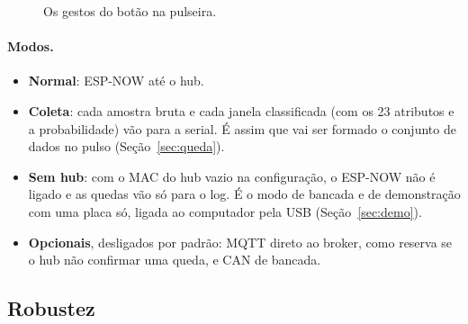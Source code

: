 \begin{figure}[H]
\centering
\resizebox{0.92\linewidth}{!}{}
\caption{Os gestos do botão na pulseira.}
\label{fig:botao_gestos}
\end{figure}

\paragraph{Modos.}
\begin{itemize}
  \item \textbf{Normal}: ESP-NOW até o hub.
  \item \textbf{Coleta}: cada amostra bruta e cada janela classificada (com os 23 atributos e
        a probabilidade) vão para a serial. É assim que vai ser formado o conjunto de dados
        no pulso (Seção~\ref{sec:queda}).
  \item \textbf{Sem hub}: com o MAC do hub vazio na configuração, o ESP-NOW não é ligado e as
        quedas vão só para o log. É o modo de bancada e de demonstração com uma placa só,
        ligada ao computador pela USB (Seção~\ref{sec:demo}).
  \item \textbf{Opcionais}, desligados por padrão: MQTT direto ao broker, como reserva se o
        hub não confirmar uma queda, e CAN de bancada.
\end{itemize}

\subsection{Robustez}\label{sec:ausente}

